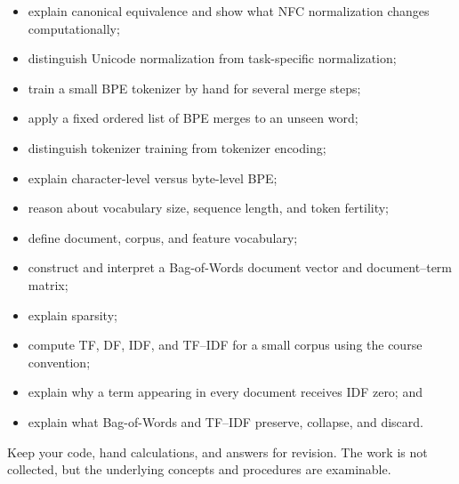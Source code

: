 \documentclass[11pt,a4paper]{article}
\begin{document}
\begin{itemize}
  \item explain canonical equivalence and show what NFC normalization changes computationally;
  \item distinguish Unicode normalization from task-specific normalization;
  \item train a small BPE tokenizer by hand for several merge steps;
  \item apply a fixed ordered list of BPE merges to an unseen word;
  \item distinguish tokenizer training from tokenizer encoding;
  \item explain character-level versus byte-level BPE;
  \item reason about vocabulary size, sequence length, and token fertility;
  \item define document, corpus, and feature vocabulary;
  \item construct and interpret a Bag-of-Words document vector and document--term matrix;
  \item explain sparsity;
  \item compute TF, DF, IDF, and TF--IDF for a small corpus using the course convention;
  \item explain why a term appearing in every document receives IDF zero; and
  \item explain what Bag-of-Words and TF--IDF preserve, collapse, and discard.
\end{itemize}

\vfill
\begin{center}
{\sffamily\color{slate}\small Keep your code, hand calculations, and answers for revision. The work is not collected, but the underlying concepts and procedures are examinable.}
\end{center}
\end{document}
